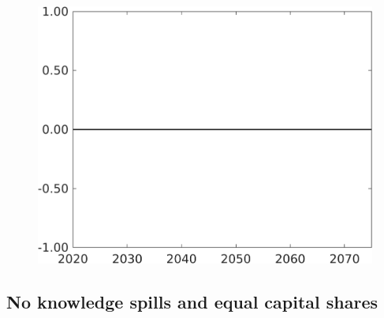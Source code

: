 \documentclass[12pt]{article}
\begin{document}
\begin{figure}[h!!]
\begin{minipage}[]{0.32\textwidth}
	\end{minipage}	
	\begin{minipage}[]{0.32\textwidth}
		\includegraphics[width=1\textwidth]{../../codding_model/own_basedOnFried/optimalPol_010922_revision/figures/all_13Sept22/CompTaufPER_bytaul_Reg0_F_spillover0_nsk0_xgr1_knspil0_sep1_LFlimit1_emsbase0_countec0_GovRev0_etaa0.79_lgd0.png}
	\end{minipage}	
\end{figure}

\clearpage \newpage
\subsection{No knowledge spills and equal capital shares}
\end{document}
